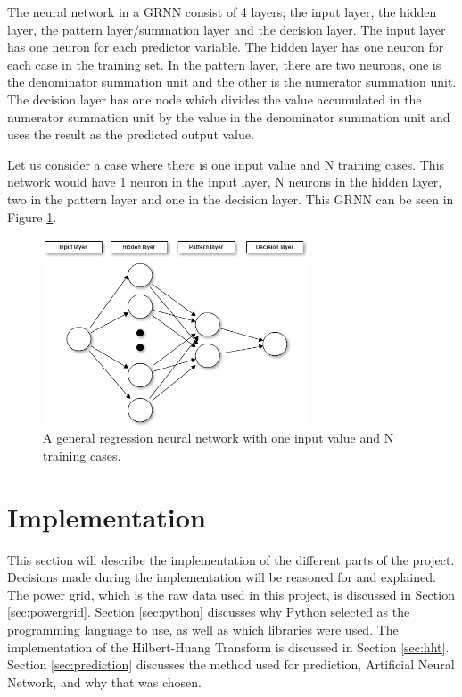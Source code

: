 \documentclass[12pt]{article}
\begin{document}
		The neural network in a GRNN consist of 4 layers; the input layer, the hidden layer, the pattern layer/summation layer and the decision layer. The input layer has one neuron for each predictor variable. The hidden layer has one neuron for each case in the training set. In the pattern layer, there are two neurons, one is the denominator summation unit and the other is the numerator summation unit. The decision layer has one node which divides the value accumulated in the numerator summation unit by the value in the denominator summation unit and uses the result as the predicted output value. 
		
		Let us consider a case where there is one input value and N training cases. This network would have 1 neuron in the input layer, N neurons in the hidden layer, two in the pattern layer and one in the decision layer. This GRNN can be seen in Figure \ref{fig:grnn}.
		
		\begin{figure}[h]
		\centering
		\includegraphics[width = 0.7\textwidth]{grnn}
		\caption{A general regression neural network with one input value and N training cases.}
		\label{fig:grnn}
		\end{figure}
		

\newpage
\section{Implementation}
	\label{sec:implementation}
	This section will describe the implementation of the different parts of the project. Decisions made during the implementation will be reasoned for and explained. The power grid, which is the raw data used in this project, is discussed in Section \ref{sec:powergrid}. Section \ref{sec:python} discusses why Python selected as the programming language to use, as well as which libraries were used. The implementation of the Hilbert-Huang Transform is discussed in Section \ref{sec:hht}. Section \ref{sec:prediction} discusses the method used for prediction, Artificial Neural Network, and why that was chosen.
	
\end{document}
